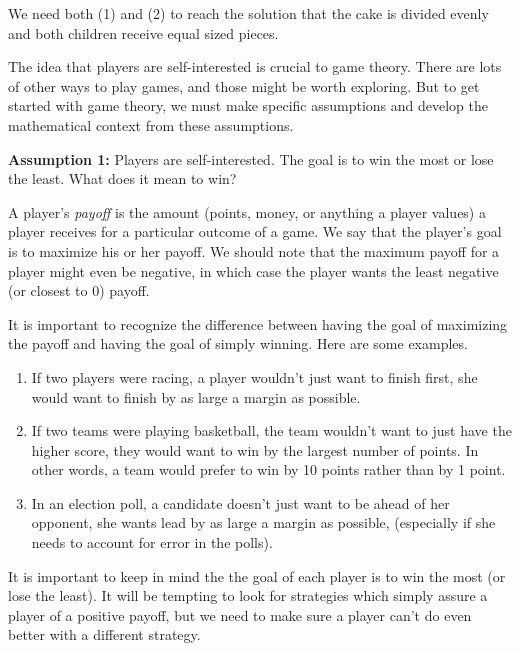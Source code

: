 We need both (1) and (2) to reach the solution that the cake is divided evenly and both children receive equal sized pieces.

The idea that players are self-interested is crucial to game theory. There are lots of other ways to play games, and those might be worth exploring. But to get started with game theory, we must make specific assumptions and develop the mathematical context from these assumptions. 


{\bf Assumption 1:} Players are self-interested. The goal is to win the most or lose the least. What does it mean to win? 

A player's \emph{payoff} is the amount (points, money, or anything a player values) a player receives for a particular outcome of a game. We say that the player's goal is to maximize his or her payoff. We should note that the maximum payoff for a player might even be negative, in which case the player wants the least negative (or closest to 0) payoff.

It is important to recognize the difference between having the goal of maximizing the payoff and having the goal of simply winning. Here are some examples.
\begin{enumerate}
\item If two players were racing, a player wouldn't just want to finish first, she would want to finish by as large a margin as possible.
\item If two teams were playing basketball, the team wouldn't want to just have the higher score, they would want to win by the largest number of points. In other words, a team would prefer to win by 10 points rather than by 1 point.
\item In an election poll, a candidate doesn't just want to be ahead of her opponent, she wants lead by as large a margin as possible, (especially if she needs to account for error in the polls).
\end{enumerate}

It is important to keep in mind the the goal of each player is to win the most (or lose the least). It will be tempting to look for strategies which simply assure a player of a positive payoff, but we need to make sure a player can't do even better with a different strategy. 


